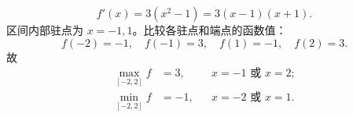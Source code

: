 \[
f'(x)=3(x^2-1)=3(x-1)(x+1).
\]
区间内部驻点为 $x=-1,1$。比较各驻点和端点的函数值：
\[
f(-2)=-1,\quad f(-1)=3,\quad f(1)=-1,\quad f(2)=3.
\]
故
\[
\boxed{\begin{aligned}
\max_{[-2,2]}f&=3,&&x=-1\text{ 或 }x=2;\\
\min_{[-2,2]}f&=-1,&&x=-2\text{ 或 }x=1.
\end{aligned}}
\]
